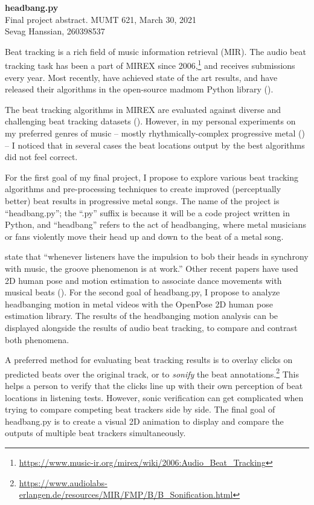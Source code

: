 \documentclass[letter,12pt]{report}
\begin{document}
\noindent\Large{\textbf{headbang.py}}\\
\large{Final project abstract. MUMT 621, March 30, 2021}\\
\large{Sevag Hanssian, 260398537}

\noindent\hrulefill

\vspace{2em}

Beat tracking is a rich field of music information retrieval (MIR). The audio beat tracking task has been a part of MIREX since 2006,\footnote{\url{https://www.music-ir.org/mirex/wiki/2006:Audio_Beat_Tracking}} and receives submissions every year. Most recently, \textcite{bock1, bock2} have achieved state of the art results, and have released their algorithms in the open-source madmom Python library (\cite{madmom}).

The beat tracking algorithms in MIREX are evaluated against diverse and challenging beat tracking datasets (\cite{beatmeta}). However, in my personal experiments on my preferred genres of music -- mostly rhythmically-complex progressive metal (\cite{meshuggah, periphery}) -- I noticed that in several cases the beat locations output by the best algorithms did not feel correct.

For the first goal of my final project, I propose to explore various beat tracking algorithms and pre-processing techniques to create improved (perceptually better) beat results in progressive metal songs. The name of the project is ``headbang.py''; the ``.py'' suffix is because it will be a code project written in Python, and ``headbang'' refers to the act of headbanging, where metal musicians or fans violently move their head up and down to the beat of a metal song.

\textcite{groove} state that ``whenever listeners have the impulsion to bob their heads in synchrony with music, the groove phenomenon is at work.'' Other recent papers have used 2D human pose and motion estimation to associate dance movements with musical beats (\cite{pose1, pose2}). For the second goal of headbang.py, I propose to analyze headbanging motion in metal videos with the OpenPose 2D human pose estimation library. The results of the headbanging motion analysis can be displayed alongside the results of audio beat tracking, to compare and contrast both phenomena.

A preferred method for evaluating beat tracking results is to overlay clicks on predicted beats over the original track, or to \textit{sonify} the beat annotations.\footnote{\url{https://www.audiolabs-erlangen.de/resources/MIR/FMP/B/B_Sonification.html}} This helps a person to verify that the clicks line up with their own perception of beat locations in listening tests. However, sonic verification can get complicated when trying to compare competing beat trackers side by side. The final goal of headbang.py is to create a visual 2D animation to display and compare the outputs of multiple beat trackers simultaneously.

\vfill
\clearpage

\nocite{*}
\printbibheading[title={\vspace{-3.5em}References},heading=bibnumbered]
\vspace{-1.5em}
\printbibliography[heading=none]
\end{document}
